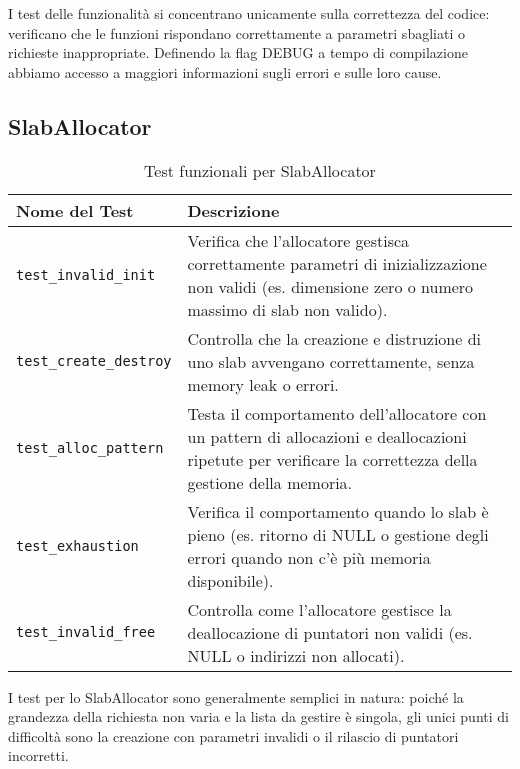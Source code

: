 I test delle funzionalità si concentrano unicamente sulla correttezza del codice: verificano che le funzioni rispondano correttamente a parametri sbagliati o richieste inappropriate. Definendo la flag DEBUG a tempo di compilazione abbiamo accesso a maggiori informazioni sugli errori e sulle loro cause.

\subsection{SlabAllocator}
\begin{table}[H]
\centering
\begin{tabularx}{\textwidth}{|l|X|}
\hline
\textbf{Nome del Test} & \textbf{Descrizione} \\
\hline
\texttt{test\_invalid\_init} & Verifica che l'allocatore gestisca correttamente parametri di inizializzazione non validi (es. dimensione zero o numero massimo di slab non valido). \\
\hline
\texttt{test\_create\_destroy} & Controlla che la creazione e distruzione di uno slab avvengano correttamente, senza memory leak o errori. \\
\hline
\texttt{test\_alloc\_pattern} & Testa il comportamento dell'allocatore con un pattern di allocazioni e deallocazioni ripetute per verificare la correttezza della gestione della memoria. \\
\hline
\texttt{test\_exhaustion} & Verifica il comportamento quando lo slab è pieno (es. ritorno di NULL o gestione degli errori quando non c'è più memoria disponibile). \\
\hline
\texttt{test\_invalid\_free} & Controlla come l'allocatore gestisce la deallocazione di puntatori non validi (es. NULL o indirizzi non allocati). \\
\hline
\end{tabularx}
\caption{Test funzionali per SlabAllocator}
\end{table}

I test per lo SlabAllocator sono generalmente semplici in natura: poiché la grandezza della richiesta non varia e la lista da gestire è singola, gli unici punti di difficoltà sono la creazione con parametri invalidi o il rilascio di puntatori incorretti.


